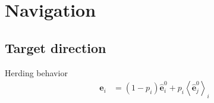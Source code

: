 \section{Navigation}
\subsection{Target direction}
Herding behavior
\begin{align}
\mathbf{e}_{i} &= (1 - p_{i}) \hat{\mathbf{e}}_{i}^{0} + p_{i} \left\langle \hat{\mathbf{e}}_{j}^{0} \right\rangle_{i}
\end{align}